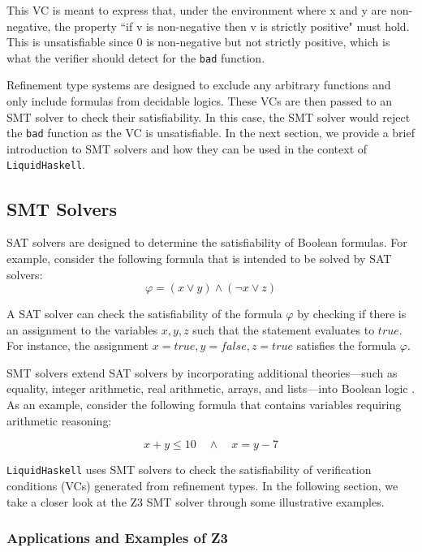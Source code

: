 \documentclass[]{rptuseminar}
\begin{document}
This VC is meant to express that, under the environment where x and y are non-negative, 
the property “if v is non-negative then v is strictly positive" must hold. 
This is unsatisfiable since 0 is non-negative but not strictly positive, which is what the verifier 
should detect for the \texttt{bad} function.

Refinement type systems are designed to exclude any arbitrary functions and only include formulas
from decidable logics\cite{vazou_refinement_2014}. These VCs are then passed to an SMT solver to check their satisfiability.
In this case, the SMT solver would reject the \texttt{bad} function as the VC is unsatisfiable.
In the next section, we provide a brief introduction to SMT solvers and how they can be used in 
the context of \texttt{LiquidHaskell}.

\subsection{SMT Solvers}
SAT solvers are designed to determine the satisfiability of Boolean formulas\cite{clarke_satisfiability_2018}. 
For example, consider the following formula that is intended to be solved by SAT solvers:
\begin{equation}
  \varphi = (x \lor y) \land (\lnot x \lor z)
\end{equation}

A SAT solver can check the satisfiability of the formula \(\varphi\) by checking if there is an assignment to the variables 
\(x, y, z\) such that the statement evaluates to \(true\).
For instance, the assignment \(x = true, y = false, z = true\) satisfies the formula \(\varphi\).

SMT solvers extend SAT solvers by incorporating additional theories—such as equality, integer arithmetic, real arithmetic, 
arrays, and lists—into Boolean logic \cite{clarke_satisfiability_2018}.
As an example, consider the following formula that contains variables requiring arithmetic reasoning:

\begin{equation}
  x + y \leq 10 \quad \land \quad x = y - 7
\end{equation}


\texttt{LiquidHaskell} uses SMT solvers to check the satisfiability of verification conditions (VCs) generated from refinement types.  
In the following section, we take a closer look at the Z3 SMT solver through some illustrative examples.

\subsubsection{Applications and Examples of Z3}
\end{document}
